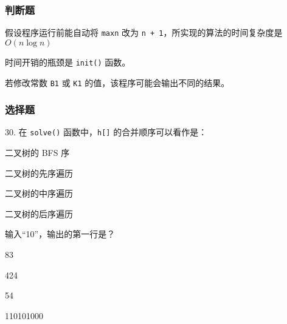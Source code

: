 \documentclass{exam-zh}
\newcommand{\code}[1]{\texttt{#1}}
\newcommand{\true}{\paren[$\checkmark$]}
\newcommand{\false}{\paren[$\times$]}
\begin{document}
    \subsubsection*{判断题}
    
    \begin{question}
        假设程序运行前能自动将 \code{maxn} 改为 \code{n + 1}，所实现的算法的时间复杂度是 $O(n
        \log n)$ \true
    \end{question}
    
    \begin{solution}

    \end{solution}

    \begin{question}
        时间开销的瓶颈是 \code{init()} 函数。 \false
    \end{question}
    
    \begin{solution}

    \end{solution}
    \begin{question}
        若修改常数 \code{B1} 或 \code{K1} 的值，该程序可能会输出不同的结果。 \true 
    \end{question}
    
    \begin{solution}

    \end{solution}


    
    \subsubsection*{选择题}
    
    \begin{question}
        30. 在 \code{solve()} 函数中，\code{h[]} 的合并顺序可以看作是：\paren[C]

        \begin{choices}
            \item  二叉树的 BFS 序
            \item  二叉树的先序遍历
            \item  二叉树的中序遍历
            \item  二叉树的后序遍历
        \end{choices}
    \end{question}
    
    \begin{solution}

    \end{solution}
    \begin{question}
        输入“10”，输出的第一行是？\paren[A]

        \begin{choices}
            \item 83
            \item 424
            \item 54
            \item 110101000
        \end{choices}
    \end{question}
    
\end{document}
